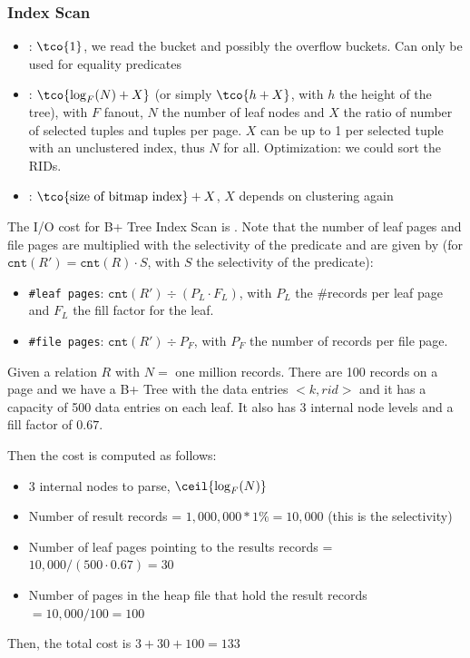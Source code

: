 \subsubsection{Index Scan}
\begin{itemize}
    \item {}: {\color{ForestGreen} $\tco{1}$, we read the bucket and possibly the overflow buckets.} {\color{red} Can only be used for equality predicates}
    \item {}: $\tco{\log_F(N) + X}$ (or simply $\tco{h + X}$, with $h$ the height of the tree),
          with $F$ fanout, $N$ the number of leaf nodes and $X$ the ratio of number of selected tuples and tuples per page.
              {\color{red} $X$ can be up to 1 per selected tuple with an unclustered index, thus $N$ for all}. Optimization: we could sort the RIDs.
    \item {}: $\tco{\text{size of bitmap index}} + X$, {\color{red} $X$ depends on clustering again}
\end{itemize}

The I/O cost for B+ Tree Index Scan is .
Note that the number of leaf pages and file pages are multiplied with the selectivity of the predicate and are given by
(for $\texttt{cnt}(R') = \texttt{cnt}(R) \cdot S$, with $S$ the selectivity of the predicate):
\begin{itemize}
    \item \texttt{\#leaf pages}: $\texttt{cnt}(R') \div (P_L \cdot F_L)$, with $P_L$ the \#records per leaf page and $F_L$ the fill factor for the leaf.
    \item \texttt{\#file pages}: $\texttt{cnt}(R') \div P_F$, with $P_F$ the number of records per file page.
\end{itemize}

Given a relation $R$ with $N =$ one million records. There are 100 records on a page and we have a B+ Tree with the data entries $<k, rid>$
and it has a capacity of 500 data entries on each leaf. It also has 3 internal node levels and a fill factor of $0.67$.

Then the cost is computed as follows:
\begin{itemize}
    \item 3 internal nodes to parse, $\ceil{\log_F(N)}$
    \item Number of result records = $1,000,000 * 1\% = 10,000$ (this is the selectivity)
    \item Number of leaf pages pointing to the results records = $10,000 / (500 \cdot 0.67) = 30$
    \item Number of pages in the heap file that hold the result records $= 10,000 / 100 = 100$
\end{itemize}
Then, the total cost is $3 + 30 + 100 = 133$
